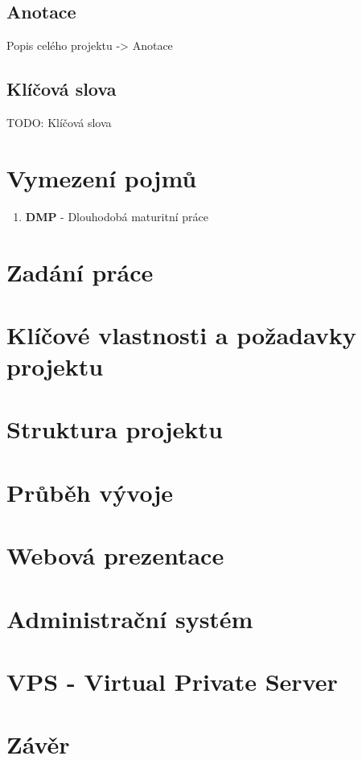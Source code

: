 \documentclass[12pt,a4paper]{report}
\begin{document}
  \section*{Anotace}
  Popis celého projektu -> Anotace

  \section*{Klíčová slova}
  
  \noindent TODO: Klíčová slova
  
  \clearpage
  
  \tableofcontents
  
  \clearpage

  \chapter{Vymezení pojmů}
  \begin{enumerate}
    \item \textbf{DMP} - Dlouhodobá maturitní práce
  \end{enumerate}
  
  \chapter{Zadání práce}

  \chapter{Klíčové vlastnosti a požadavky projektu}
  \chapter{Struktura projektu}
  \chapter{Průběh vývoje}
  \chapter{Webová prezentace}
  \chapter{Administrační systém}
  \chapter{VPS - Virtual Private Server}
  \chapter{Závěr}
\end{document}

